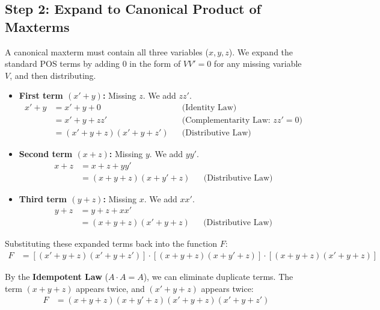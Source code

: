 \documentclass[12pt,a3paper]{article}
\begin{document}
\begin{enumerate}
\begin{tcolorbox}[enhanced,breakable,ansbox,colback=cB!4,colframe=cB,boxrule=0.8pt,arc=5pt,title={\textbf{Answer}},fonttitle=\bfseries\color{white},colbacktitle=cB]
\section*{Step 2: Expand to Canonical Product of Maxterms}

A canonical maxterm must contain all three variables ($x, y, z$). We expand the standard POS terms by adding $0$ in the form of $VV' = 0$ for any missing variable $V$, and then distributing.

\begin{itemize}
    \item \textbf{First term $(x' + y)$:} Missing $z$. We add $zz'$.
    \begin{align*}
        x' + y &= x' + y + 0 && \text{(Identity Law)} \\
        &= x' + y + zz' && \text{(Complementarity Law: } zz' = 0 \text{)} \\
        &= (x' + y + z)(x' + y + z') && \text{(Distributive Law)}
    \end{align*}
    
    \item \textbf{Second term $(x + z)$:} Missing $y$. We add $yy'$.
    \begin{align*}
        x + z &= x + z + yy' \\
        &= (x + y + z)(x + y' + z) && \text{(Distributive Law)}
    \end{align*}
    
    \item \textbf{Third term $(y + z)$:} Missing $x$. We add $xx'$.
    \begin{align*}
        y + z &= y + z + xx' \\
        &= (x + y + z)(x' + y + z) && \text{(Distributive Law)}
    \end{align*}
\end{itemize}

Substituting these expanded terms back into the function $F$:
\begin{align*}
    F &= \left[ (x' + y + z)(x' + y + z') \right] \cdot \left[ (x + y + z)(x + y' + z) \right] \cdot \left[ (x + y + z)(x' + y + z) \right]
\end{align*}

By the \textbf{Idempotent Law} ($A \cdot A = A$), we can eliminate duplicate terms. The term $(x + y + z)$ appears twice, and $(x' + y + z)$ appears twice:
\begin{align*}
    F &= (x + y + z)(x + y' + z)(x' + y + z)(x' + y + z')
\end{align*}


\end{tcolorbox}
\end{enumerate}
\end{document}
